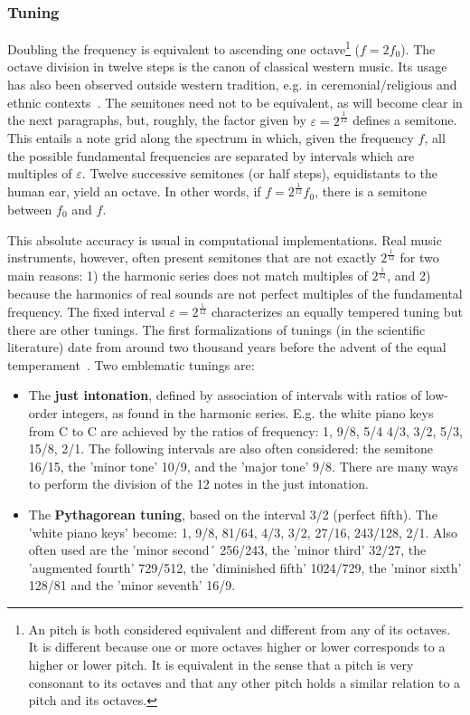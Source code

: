 \subsubsection{Tuning}
Doubling the frequency is equivalent to ascending one octave\footnote{An pitch
is both considered equivalent and different from any of its octaves.
It is different because one or more octaves higher or lower corresponds to
a higher or lower pitch.
It is equivalent in the sense that a pitch is very consonant to its octaves
and that any other pitch holds a similar relation to a pitch and its octaves.} ($f=2f_0$).
The octave division in twelve steps is the canon of classical western music.
Its usage has also been observed
outside western tradition, e.g. in ceremonial/religious and ethnic contexts~\cite{Wisnick}.
The semitones need not to be equivalent, as will become clear in the next paragraphs, but, roughly, the factor given by $\varepsilon=2^{\frac{1}{12}}$ defines a semitone.
This entails a note grid along the spectrum in which, given the frequency $f$, all the possible fundamental frequencies are separated by intervals which are multiples of $\varepsilon$. Twelve successive semitones (or half steps), equidistants to the human ear, yield an
octave. In other words, if $f=2^{\frac{1}{12}}f_0$, there is a semitone between
$f_0$ and $f$.

This absolute accuracy is usual in computational implementations.
Real music instruments, however, often present semitones that are not exactly $2^{\frac{1}{12}}$
for two main reasons: 1) the harmonic series does not match multiples of $2^{\frac{1}{12}}$,
and 2) because the harmonics of real sounds are not perfect multiples of the fundamental frequency.
The fixed interval $\varepsilon=2^{\frac{1}{12}}$ characterizes an equally tempered tuning but there are other tunings. The first formalizations of tunings (in the scientific literature) date from around two thousand years before the advent of the equal temperament~\cite{Roederer}.
Two emblematic tunings are:
\begin{itemize}
    \item The {\bf just intonation}, defined by association of intervals with ratios of low-order integers, as found in the harmonic series. E.g. the white piano keys from C to C are achieved by the ratios of frequency: 1, 9/8, 5/4
    4/3, 3/2, 5/3, 15/8, 2/1. The following intervals are also often considered: the semitone 16/15, the 'minor tone' 10/9, and the 'major tone' 9/8. There are many ways to perform the division of the 12 notes in the just intonation.
    \item The {\bf Pythagorean tuning}, based on the interval 3/2 (perfect fifth). The 'white piano keys' become: 1, 9/8, 81/64, 4/3, 3/2, 27/16, 243/128, 2/1. Also often used are the 'minor second´ 256/243, the 'minor third' 32/27, the 'augmented fourth' 729/512, the 'diminished fifth' 1024/729, the 'minor sixth' 128/81 and the 'minor seventh' 16/9. 
\end{itemize}

